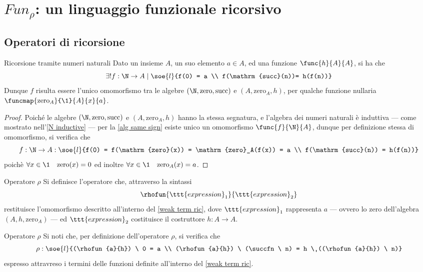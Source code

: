 \documentclass[a4paper, 12pt]{report}
\begin{document}
    \section{$Fun_\rho$: un linguaggio funzionale ricorsivo}

    \subsection{Operatori di ricorsione}

    \begin{framedlem}[label={weak term ric}]{Ricorsione tramite numeri naturali}
        Dato un insieme $A$, un suo elemento $a \in A$, ed una funzione $\func{h}{A}{A}$, si ha che $$\exists ! f: \N \to A \mid \soe{l}{f(0) = a \\ f(\mathrm{succ}(n))= h(f(n))}$$ Dunque $f$ risulta essere l'unico omomorfismo tra le algebre $(\N, \mathrm{zero}, \mathrm{succ})$ e $(A, \mathrm{zero}_A, h)$, per qualche funzione nullaria $\funcmap{\mathrm{zero}_A}{\1}{A}{x}{a}$.
    \end{framedlem}

    \begin{proof}
        Poiché le algebre $(\N, \mathrm{zero}, \mathrm{succ})$ e $(A, \mathrm{zero}_A, h)$ hanno la stessa segnatura, e l'algebra dei numeri naturali è induttiva --- come mostrato nell'\cref{N inductive} --- per la \cref{alg same sign} esiste unico un omomorfismo $\func{f}{\N}{A}$, dunque per definizione stessa di omomorfismo, si verifica che $$f:\N \to A :\soe{l}{f(0) = f(\mathrm{zero}(x)) = \mathrm{zero}_A(f(x)) = a \\ f(\mathrm{succ}(n)) = h(f(n))}$$ poichè $\forall x \in \1 \quad \mathrm{zero}(x) = 0$ ed inoltre $\forall x \in \1 \quad \mathrm{zero}_A(x) = a$.
    \end{proof}

    \begin{frameddefn}{Operatore $\rho$}
        Si definisce  l'operatore che, attraverso la sintassi $$\rhofun{\ttt{expression}_1}{\ttt{expression}_2}$$ restituisce l'omomorfismo descritto all'interno del \cref{weak term ric}, dove $\ttt{expression}_1$ rappresenta $a$ --- ovvero lo zero dell'algebra $(A, h, \mathrm{zero}_A)$ --- ed $\ttt{expression}_2$ costituisce il costruttore $h: A \to A$.
    \end{frameddefn}

    \begin{framedobs}[label={rho obs}]{Operatore $\rho$}
        Si noti che, per definizione dell'operatore $\rho$, si verifica che $$\rho : \soe{l}{(\rhofun{a}{h}) \ 0 = a \\ (\rhofun{a}{h}) \ (\succfn \ n) = h \ ((\rhofun{a}{h}) \ n)}$$ espresso attravreso i termini delle funzioni definite all'interno del \cref{weak term ric}.
    \end{framedobs}
\end{document}
